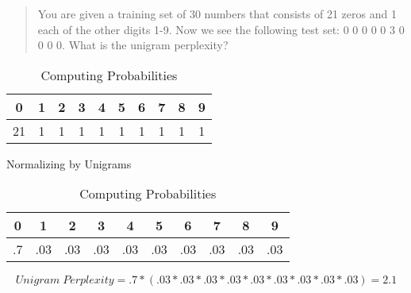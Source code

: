 \begin{quote}
You are given a training set of 30 numbers that consists of 21 zeros and 1 each of the other digits 1-9. Now we see the following test set: 0 0 0 0 0 3 0 0 0 0. What is the unigram perplexity?
\end{quote}
\begin{table}[h!]
\centering
\begin{tabular}{|| c c c c c c c c c c |}
\hline
 0 & 1 & 2 & 3 & 4 & 5 & 6 & 7 & 8 & 9\\
 \hline
 \hline
 21 & 1 & 1 & 1 & 1 & 1 & 1 & 1 & 1 & 1\\
 \hline
\end{tabular}
\caption{Normalizing by Unigrams}

\begin{tabular}{|| c c c c c c c c c c |}
\hline
 0 & 1 & 2 & 3 & 4 & 5 & 6 & 7 & 8 & 9\\
 \hline
 \hline
 .7 & .03 & .03 & .03 & .03 & .03 & .03 & .03 & .03 & .03\\
 \hline
\end{tabular}
\caption{Computing Probabilities}
\end{table}
\begin{equation}
Unigram\; Perplexity = .7 * (.03 * .03 * .03 * .03 * .03 * .03 * .03 * .03 * .03) = 2.1
\end{equation}
